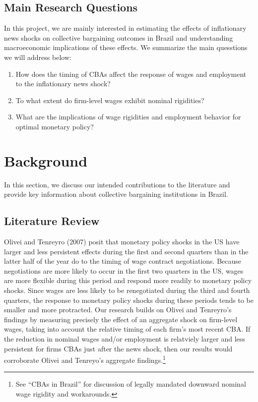 \documentclass[12pt]{article}
\begin{document}
		\subsection{Main Research Questions}
		In this project, we are mainly interested in estimating the effects of inflationary news shocks on collective bargaining outcomes in Brazil and understanding macroeconomic implications of these effects. We summarize the main quesstions we will address below:  
		\begin{enumerate}
			\item How does the timing of CBAs affect the response of wages and employment to the inflationary news shock?

			\item To what extent do firm-level wages exhibit nominal rigidities?

			\item What are the implications of wage rigidities and employment behavior for optimal monetary policy?
		\end{enumerate}
	\section{Background}
	In this section, we discuss our intended contributions to the literature and provide key information about collective bargaining institutions in Brazil.
		\subsection{Literature Review}
		Olivei and Tenreyro (2007) posit that monetary policy shocks in the US have larger and less persistent effects during the first and second quarters than in the latter half of the year do to the timing of wage contract negotiations. Because negotiations are more likely to occur in the first two quarters in the US, wages are more flexible during this period and respond more readily to monetary policy shocks. Since wages are less likely to be renegotiated during the third and fourth quarters, the response to monetary policy shocks during these periods tends to be smaller and more protracted. Our research builds on Olivei and Tenreyro's findings by measuring precisely the effect of an aggregate shock on firm-level wages, taking into account the relative timing of each firm's most recent CBA. If the reduction in nominal wages and/or employment is relatviely larger and less persistent for firms CBAs just after the news shock, then our results would corroborate Olivei and Tenreyo's aggregate findings.\footnote{See ``CBAs in Brazil'' for discussion of legally mandated downward nominal wage rigidity and workarounds.}
\end{document}
